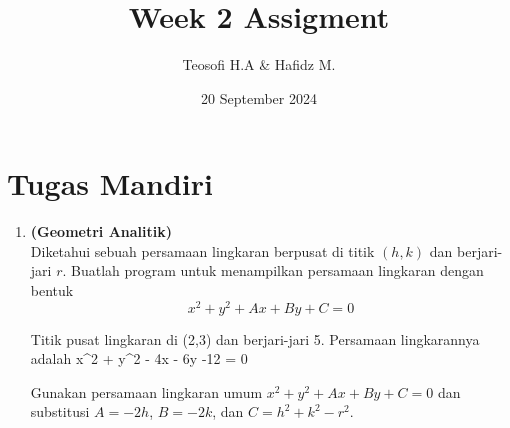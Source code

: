 \documentclass{article}
\title{\textbf{Week 2 Assigment}}
\date{20 September 2024}
\author{Teosofi H.A \& Hafidz M.}
\begin{document}
    \maketitle

    \section*{Tugas Mandiri}
    \begin{enumerate}[label=\textbf{\arabic*.}]
        \item \textbf{(Geometri Analitik)}\\
        Diketahui sebuah persamaan lingkaran berpusat di titik $(h,k)$ dan berjari-jari $r$. Buatlah program untuk menampilkan persamaan lingkaran dengan bentuk
        \[x^2+y^2+Ax+By+C=0\]
        \begin{RunCode}{}
Titik pusat lingkaran di (2,3) dan berjari-jari 5.
Persamaan lingkarannya adalah x^2 + y^2 - 4x - 6y -12 = 0
        \end{RunCode}
        \begin{hint}[]{}
            Gunakan persamaan lingkaran umum $x^2+y^2+Ax+By+C=0$ dan substitusi $A=-2h$, $B=-2k$, dan $C=h^2+k^2-r^2$.
        \end{hint}
          

\end{enumerate}
\end{document}
